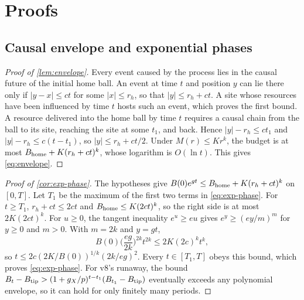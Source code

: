\documentclass[11pt,a4paper]{article}
\theoremstyle{definition}
\newcommand{\Btip}{B_{\rm tip}}
\begin{document}
\appendix
\section{Proofs}
\label{app:proofs}

\subsection{Causal envelope and exponential phases}
\label{app:envelope-proof}
\begin{proof}[Proof of \cref{lem:envelope}]
Every event caused by the process lies in the causal future of the initial
home ball. An event at time $t$ and position $y$ can lie there only if
$|y-x|\leq ct$ for some $|x|\leq r_h$, so that $|y|\leq r_h+ct$. A site whose
resources have been influenced by time $t$ hosts such an event, which proves
the first bound. A resource delivered into the home ball by time $t$ requires
a causal chain from the ball to its site, reaching the site at some $t_1$, and
back. Hence $|y|-r_h\leq ct_1$ and $|y|-r_h\leq c(t-t_1)$, so
$|y|\leq r_h+ct/2$. Under $M(r)\leq Kr^k$, the budget is at most
$B_{\rm home}+K(r_h+ct)^k$, whose logarithm is $O(\ln t)$. This gives
\cref{eq:envelope}.
\end{proof}

\begin{proof}[Proof of \cref{cor:exp-phase}]
The hypotheses give $B(0)e^{gt}\leq B_{\rm home}+K(r_h+ct)^k$ on $[0,T]$. Let
$T_1$ be the maximum of the first two terms in \cref{eq:exp-phase}. For
$t\geq T_1$, $r_h+ct\leq2ct$ and $B_{\rm home}\leq K(2ct)^k$, so the right side
is at most $2K(2ct)^k$. For $u\geq0$, the tangent inequality $e^u\geq eu$ gives
$e^{y}\geq(ey/m)^m$ for $y\geq0$ and $m>0$. With $m=2k$ and $y=gt$,
\[
 B(0)\Big(\frac{eg}{2k}\Big)^{2k}t^{2k}\leq2K(2c)^kt^k,
\]
so $t\leq2c(2K/B(0))^{1/k}(2k/eg)^2$. Every $t\in[T_1,T]$ obeys this bound,
which proves \cref{eq:exp-phase}. For v8's runaway, the bound
$B_t-\Btip>(1+g_X/p)^{t-t_1}(B_{t_1}-\Btip)$ eventually exceeds any polynomial
envelope, so it can hold for only finitely many periods.
\end{proof}
\end{document}
